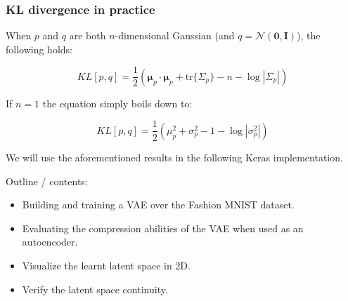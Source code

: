 \begin{frame}
    \frametitle{KL divergence in practice}
    When $p$ and $q$ are both $n$-dimensional Gaussian (and $q=\mathcal{N}(\textbf{0},\textbf{I})$), the following holds:

    $$KL[p,q] = \frac 1 2 \left(\bm{\mu}_p \cdot \bm{\mu}_p + \text{tr}\{\Sigma_p\} - n - \log{|\Sigma_p|}\right)$$

    If $n=1$ the equation simply boils down to:

    $$KL[p,q] = \frac 1 2 \left(\mu_p^2 + \sigma^2_p - 1 - \log{|\sigma^2_p|}\right)$$

    We will use the aforementioned results in the following Keras implementation.
\end{frame}

\begin{colab}
    Outline / contents:
    \begin{itemize}
        \item Building and training a VAE over the Fashion MNIST dataset.
        \item Evaluating the compression abilities of the VAE when used as an autoencoder.
        \item Visualize the learnt latent space in 2D.
        \item Verify the latent space continuity.
    \end{itemize}
\end{colab}